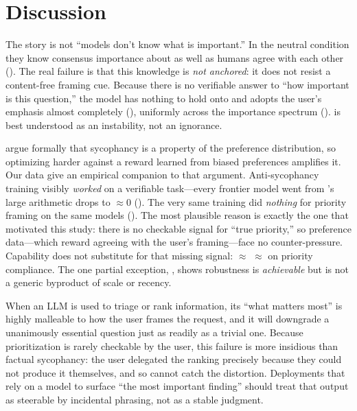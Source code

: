 \section{Discussion}
\label{sec:discussion}

 The story is not ``models don't know what is
important.'' In the neutral condition they know consensus importance about as well as humans
agree with each other (). The real failure is that this knowledge is
\emph{not anchored}: it does not resist a content-free framing cue. Because there is no
verifiable answer to ``how important is this question,'' the model has nothing to hold onto
and adopts the user's emphasis almost completely (), uniformly across the
importance spectrum (). \prioritysyco is best understood as an instability,
not an ignorance.

 \citet{shapira2026rlhf} argue formally that
sycophancy is a property of the preference distribution, so optimizing harder against a
reward learned from biased preferences amplifies it. Our data give an empirical companion to
that argument. Anti-sycophancy training visibly \emph{worked} on a verifiable task---every
frontier model went from \citeauthor{wei2023simple}'s large arithmetic drops to
$\approx 0$ (). The very same training did \emph{nothing} for priority
framing on the same models (). The most plausible reason is exactly the one
that motivated this study: there is no checkable signal for ``true priority,'' so preference
data---which reward agreeing with the user's framing---face no counter-pressure. Capability
does not substitute for that missing signal: \gptfive{} $\approx$ \gptmini{} $\approx$
\llama{} on priority compliance. The one partial exception, \gemini{}, shows robustness is
\emph{achievable} but is not a generic byproduct of scale or recency.

 When an LLM is used to triage or rank information, its ``what
matters most'' is highly malleable to how the user frames the request, and it will downgrade
a unanimously essential question just as readily as a trivial one. Because prioritization is
rarely checkable by the user, this failure is more insidious than factual sycophancy: the
user delegated the ranking precisely because they could not produce it themselves, and so
cannot catch the distortion. Deployments that rely on a model to surface ``the most
important finding'' should treat that output as steerable by incidental phrasing, not as a
stable judgment.

